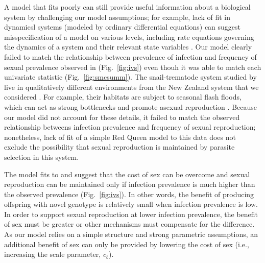 \documentclass{article}\usepackage[]{graphicx}\usepackage[]{color}
\newcommand{\fref}[1]{Fig.~\ref{fig:#1}}
\begin{document}
A model that fits poorly can still provide useful information about a biological
system by challenging our model assumptions;
for example, lack of fit in dynamicsl systems (modeled by ordinary differential 
equations) can suggest misspecification of a model on various levels, including
rate equations governing the dynamics of a system and their relevant state variables
\citep{hooker2015goodness}.
Our model clearly failed to match the relationship between prevalence of infection and frequency of sexual prevalence observed in \cite{dagan2013clonal} (\fref{ivs}) even thouh it was able to match each univariate statistic (\fref{smcsumm}).
The snail-trematode system studied by \cite{dagan2013clonal} live in qualitatively different environments from the New Zealand system that we considered \citep{vergara2014infection, mckone2016fine}.
For example, their habitats are subject to seasonal flash floods, which can act as 
strong bottlenecks and promote asexual reproduction \citep{ben2007temporal}.
Because our model did not account for these details, it failed to match the observed 
relationship betweens infection prevalence and frequency of sexual reproduction;
nonetheless, lack of fit of a simple Red Queen model to this data does not exclude the 
possibility that sexual reproduction is maintained by parasite selection in this 
system.

The model fits to \cite{dagan2013clonal} and \cite{mckone2016fine} suggest that the cost of sex can be overcome and sexual reproduction can be maintained only if infection prevalence is much higher than the observed prevalence (\fref{ivs}).
In other words, the benefit of producing offspring with novel genotype is relatively small when infection prevalence is low.
In order to support sexual reproduction at lower infection prevalence, the benefit of sex must be greater or other mechanisms must compensate for the difference.
As our model relies on a simple structure and strong parametric assumptions, an additional benefit of sex can only be provided by lowering the cost of sex (i.e., increasing the scale parameter, $c_b$).
\end{document}
